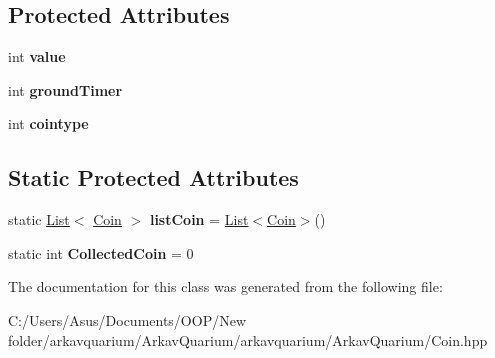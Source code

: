\subsection*{Protected Attributes}
\begin{DoxyCompactItemize}
\item 
\mbox{\label{class_coin_a3273e38e55be31a1c123fc0a46820467}} 
int {\bfseries value}
\item 
\mbox{\label{class_coin_add139e05dcc9a7c9447a64a8c359df0b}} 
int {\bfseries ground\+Timer}
\item 
\mbox{\label{class_coin_adf27a764ac814ecd81cc43a6514b3ea1}} 
int {\bfseries cointype}
\end{DoxyCompactItemize}
\subsection*{Static Protected Attributes}
\begin{DoxyCompactItemize}
\item 
\mbox{\label{class_coin_a453588a8bec6761c106b80c2455d2b8f}} 
static \mbox{\hyperlink{class_list}{List}}$<$ \mbox{\hyperlink{class_coin}{Coin}} $>$ {\bfseries list\+Coin} = \mbox{\hyperlink{class_list}{List}}$<$\mbox{\hyperlink{class_coin}{Coin}}$>$()
\item 
\mbox{\label{class_coin_a25fe8e8e24c94da1dd64d50be9703c9f}} 
static int {\bfseries Collected\+Coin} = 0
\end{DoxyCompactItemize}


The documentation for this class was generated from the following file\+:\begin{DoxyCompactItemize}
\item 
C\+:/\+Users/\+Asus/\+Documents/\+O\+O\+P/\+New folder/arkavquarium/\+Arkav\+Quarium/arkavquarium/\+Arkav\+Quarium/Coin.\+hpp\end{DoxyCompactItemize}
